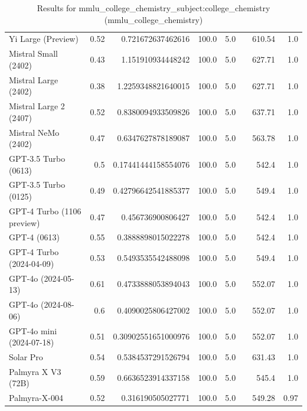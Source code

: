 \begin{table}[htp]
{\begin{tabular}{lrrrrrrr}
Yi Large (Preview) & 0.52 & 0.721672637462616 & 100.0 & 5.0 &  & 610.54 & 1.0 \\
Mistral Small (2402) & 0.43 & 1.151910934448242 & 100.0 & 5.0 &  & 627.71 & 1.0 \\
Mistral Large (2402) & 0.38 & 1.2259348821640015 & 100.0 & 5.0 &  & 627.71 & 1.0 \\
Mistral Large 2 (2407) & 0.52 & 0.8380094933509826 & 100.0 & 5.0 &  & 637.71 & 1.0 \\
Mistral NeMo (2402) & 0.47 & 0.6347627878189087 & 100.0 & 5.0 &  & 563.78 & 1.0 \\
GPT-3.5 Turbo (0613) & 0.5 & 0.17441444158554076 & 100.0 & 5.0 &  & 542.4 & 1.0 \\
GPT-3.5 Turbo (0125) & 0.49 & 0.42796642541885377 & 100.0 & 5.0 &  & 549.4 & 1.0 \\
GPT-4 Turbo (1106 preview) & 0.47 & 0.456736900806427 & 100.0 & 5.0 &  & 542.4 & 1.0 \\
GPT-4 (0613) & 0.55 & 0.3888898015022278 & 100.0 & 5.0 &  & 542.4 & 1.0 \\
GPT-4 Turbo (2024-04-09) & 0.53 & 0.5493535542488098 & 100.0 & 5.0 &  & 549.4 & 1.0 \\
GPT-4o (2024-05-13) & 0.61 & 0.4733888053894043 & 100.0 & 5.0 &  & 552.07 & 1.0 \\
GPT-4o (2024-08-06) & 0.6 & 0.4090025806427002 & 100.0 & 5.0 &  & 552.07 & 1.0 \\
GPT-4o mini (2024-07-18) & 0.51 & 0.30902551651000976 & 100.0 & 5.0 &  & 552.07 & 1.0 \\
Solar Pro & 0.54 & 0.5384537291526794 & 100.0 & 5.0 &  & 631.43 & 1.0 \\
Palmyra X V3 (72B) & 0.59 & 0.6636523914337158 & 100.0 & 5.0 &  & 545.4 & 1.0 \\
Palmyra-X-004 & 0.52 & 0.316190505027771 & 100.0 & 5.0 &  & 549.28 & 0.97 \\
\bottomrule
\end{tabular}}
\caption{Results for mmlu_college_chemistry_subject:college_chemistry (mmlu_college_chemistry)}
\label{fig:mmlu_college_chemistry_subject:college_chemistry (mmlu_college_chemistry)}
\end{table}